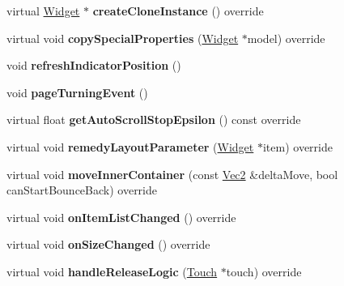 \begin{DoxyCompactItemize}
virtual \hyperlink{classui_1_1Widget}{Widget} $\ast$ {\bfseries create\+Clone\+Instance} () override
\item 
\mbox{\label{classui_1_1PageView_ad5b8a146a86cdc08c40b21516e30e32a}} 
virtual void {\bfseries copy\+Special\+Properties} (\hyperlink{classui_1_1Widget}{Widget} $\ast$model) override
\item 
\mbox{\label{classui_1_1PageView_ac41eee2f48d36be3816f90024cb01ab5}} 
void {\bfseries refresh\+Indicator\+Position} ()
\item 
\mbox{\label{classui_1_1PageView_ac394e95ac9ba2a999d2c4bcfbf10beaf}} 
void {\bfseries page\+Turning\+Event} ()
\item 
\mbox{\label{classui_1_1PageView_a4e311f29ac8d224a4d3253bf24903c1f}} 
virtual float {\bfseries get\+Auto\+Scroll\+Stop\+Epsilon} () const override
\item 
\mbox{\label{classui_1_1PageView_a732aebced86154690a1002659a5aa403}} 
virtual void {\bfseries remedy\+Layout\+Parameter} (\hyperlink{classui_1_1Widget}{Widget} $\ast$item) override
\item 
\mbox{\label{classui_1_1PageView_acab1e6f39823bf8512bb7dadab47ff69}} 
virtual void {\bfseries move\+Inner\+Container} (const \hyperlink{classVec2}{Vec2} \&delta\+Move, bool can\+Start\+Bounce\+Back) override
\item 
\mbox{\label{classui_1_1PageView_a83ddcba8fef05969a2874643ba5cdfd6}} 
virtual void {\bfseries on\+Item\+List\+Changed} () override
\item 
\mbox{\label{classui_1_1PageView_a78da98c9df25fc404ce9ba6d8c683919}} 
virtual void {\bfseries on\+Size\+Changed} () override
\item 
\mbox{\label{classui_1_1PageView_a9eda9d9065ad802a914d848468a41162}} 
virtual void {\bfseries handle\+Release\+Logic} (\hyperlink{classTouch}{Touch} $\ast$touch) override
\item 
\mbox{\label{classui_1_1PageView_a2e4b19b17d4f0a2969161b1bb173332b}} 

\end{DoxyCompactItemize}
